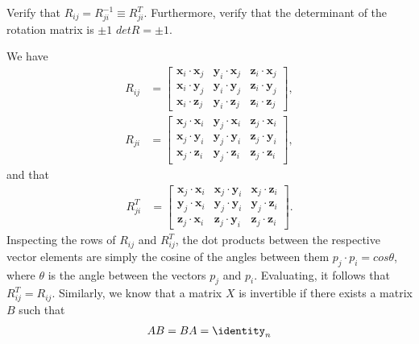 
\noindent 
\begin{homework}
	Verify that $R_{ij} = R_{ji}^{-1} \equiv R_{ji}^T$. Furthermore, verify that the determinant of the rotation matrix is $\pm1$ \ie $det R = \pm1$.
\end{homework}

\begin{solution}
	We have 
%
\begin{align}
R_{ij} &= 	\begin{bmatrix}
	\bm{x}_i \cdot \bm{x}_j & \bm{y}_i \cdot \bm{x}_j & \bm{z}_i \cdot \bm{x}_j \\
	\bm{x}_i \cdot \bm{y}_j & \bm{y}_i \cdot \bm{y}_j & \bm{z}_i \cdot \bm{y}_j \\
	\bm{x}_i \cdot \bm{z}_j & \bm{y}_i \cdot \bm{z}_j & \bm{z}_i \cdot \bm{z}_j 
	\end{bmatrix},
	\label{eq:rot}
	\end{align} 
	\begin{align}
	R_{ji} &= 	\begin{bmatrix}
	\bm{x}_j \cdot \bm{x}_i & \bm{y}_j \cdot \bm{x}_i & \bm{z}_j \cdot \bm{x}_i \\
	\bm{x}_j \cdot \bm{y}_i & \bm{y}_j \cdot \bm{y}_i & \bm{z}_j \cdot \bm{y}_i \\
	\bm{x}_j \cdot \bm{z}_i & \bm{y}_j \cdot \bm{z}_i & \bm{z}_j \cdot \bm{z}_i 
	\end{bmatrix},
	\label{eq:rot_rev}
	\end{align}	
	and that
\begin{align}
	R_{ji}^T & = 
	\begin{bmatrix}
	\bm{x}_j \cdot \bm{x}_i & \bm{x}_j \cdot \bm{y}_i  & \bm{x}_j \cdot \bm{z}_i \\
	\bm{y}_j \cdot \bm{x}_i & \bm{y}_j \cdot \bm{y}_i & \bm{y}_j \cdot \bm{z}_i \\
	\bm{z}_j \cdot \bm{x}_i & \bm{z}_j \cdot \bm{y}_i  & \bm{z}_j \cdot \bm{z}_i 
	\end{bmatrix}.
	\end{align}
	Inspecting the rows of $R_{ij}$ and $R_{ij}^T$, the dot products between the respective vector elements are simply the cosine of the angles between them \ie $p_j \cdot p_i = cos \theta$, where $\theta$ is the angle between the vectors $p_j$ and $p_i$. Evaluating, it follows that $R_{ij}^T = R_{ij}$. Similarly, we know that a matrix $X$ is invertible if there exists a matrix $B$ such that
	\begin{align}
		AB = BA = \identity_n
	\end{align}

\end{solution}
